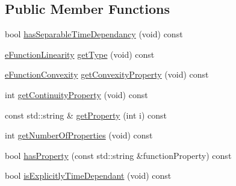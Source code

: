 \subsection*{Public Member Functions}
\begin{DoxyCompactItemize}
\item 
bool \hyperlink{classocra_1_1IFunctionProperties_abc723a9def6656293c2e9ffeef133d65}{has\+Separable\+Time\+Dependancy} (void) const
\end{DoxyCompactItemize}
{\bf }\par
\begin{DoxyCompactItemize}
\item 
\hyperlink{namespaceocra_a87b525b5508b0f6e9d931f14c7c226ab}{e\+Function\+Linearity} \hyperlink{classocra_1_1IFunctionProperties_a247de3887681fa72014273d131a2e090}{get\+Type} (void) const
\item 
\hyperlink{namespaceocra_ae6e8dca6121e9618486a449754876119}{e\+Function\+Convexity} \hyperlink{classocra_1_1IFunctionProperties_a53e39be08b8883d55193c87168743e3e}{get\+Convexity\+Property} (void) const
\item 
int \hyperlink{classocra_1_1IFunctionProperties_a2b999c6d608ee84135d7daf56a86420f}{get\+Continuity\+Property} (void) const
\item 
const std\+::string \& \hyperlink{classocra_1_1IFunctionProperties_a80d578a7679e4f87594322f963974ef9}{get\+Property} (int i) const
\item 
int \hyperlink{classocra_1_1IFunctionProperties_ae0290dc1f3be7295512af731ede8c981}{get\+Number\+Of\+Properties} (void) const
\item 
bool \hyperlink{classocra_1_1IFunctionProperties_a9484dcc696cc2425ae1e1e10fa79b5ba}{has\+Property} (const std\+::string \&function\+Property) const
\item 
bool \hyperlink{classocra_1_1IFunctionProperties_a02751762b878ab2ccefb36f2bec696e5}{is\+Explicitly\+Time\+Dependant} (void) const
\end{DoxyCompactItemize}


